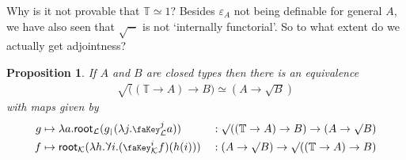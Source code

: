 \documentclass[10pt]{article}
\newtheorem{proposition}[theorem]{Proposition}
\theoremstyle{definition}
\renewcommand{\equiv}{\simeq}
\newcommand{\key}{\mathchoice
{\scalebox{0.8}{\text{\faKey}}}
{\scalebox{0.8}{\text{\faKey}}}
{\scalebox{0.5}{\text{\faKey}}}
{\scalebox{0.4}{\text{\faKey}}}
}
\newcommand{\Tiny}{\mathbb{T}}
\newcommand{\lockn}[1]{\mathcal{#1}}
\newcommand{\varkey}[2]{\key_{\lockn{#1}}^{#2}}
\newcommand{\rformu}[1]{\surd #1}
\newcommand{\rintro}[2]{\mathsf{root}_{\lockn{#1}}(#2)}
\newcommand{\rbindsym}{\scalerel*{\reflectbox{\rotatebox[origin=c]{180}{$\lambda$}}}{\lambda}}
\newcommand{\relim}[1]{\rbindsym #1}
\newcommand{\rget}[1]{{#1}_{\downharpoonleft}}
\begin{document}
Why is it not provable that $\Tiny \equiv 1$? Besides $\varepsilon_A$ not being definable for general $A$, we have also seen that $\rformu -$ is not `internally functorial'. So to what extent do we actually get adjointness?
\begin{proposition}
If $A$ and $B$ are closed types then there is an equivalence
\begin{align*}
\rformu ((\Tiny \to A) \to B) \equiv (A \to \rformu B)
\end{align*}
with maps given by
\begin{alignat*}{2}
g &\mapsto \lambda a. \rintro{L}{\rget{g}(\lambda j.\varkey{L}{j} a)} &&: \rformu((\Tiny \to A) \to B) \to (A \to \rformu B) \\
f &\mapsto \rintro{K}{\lambda h. \relim{i.(\varkey{K}{i} f)(h(i))}} &&: (A \to \rformu B) \to \rformu ((\Tiny \to A) \to B)
\end{alignat*}
\end{proposition}
\end{document}
